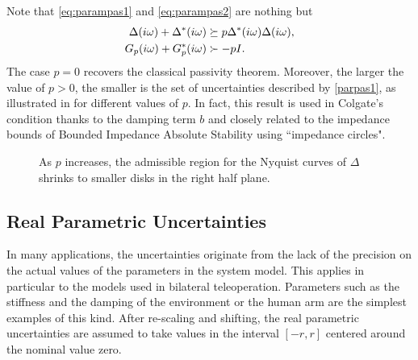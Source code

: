 \begin{rem}Note that \eqref{eq:parampas1} and \eqref{eq:parampas2} are nothing but
\begin{align}
	\Delta(i\omega) + \Delta^*(i\omega) &\succeq p\Delta^*(i\omega)\Delta(i\omega),\label{parpas1}\\
	G_p(i\omega) + G_p^*(i\omega) &\succ -pI.\label{parpas2}
\end{align}
The case $p=0$ recovers the classical passivity theorem. Moreover, the larger the value of $p>0$, the smaller is the set of uncertainties described by \eqref{parpas1}, as illustrated in  for different values of $p$. In fact, this result is used in Colgate's condition thanks to the damping term $b$ and closely related to the impedance bounds of Bounded Impedance Absolute Stability \cite{haddadizaad} using ``impedance circles".
\end{rem}

\begin{figure}%
\centering
{}
\caption{As $p$ increases, the admissible region for the Nyquist curves of $\Delta$ shrinks to smaller disks in the right half plane.}
\label{fig:pregions}%
\end{figure}


\subsection{Real Parametric Uncertainties}\label{sec:ltvenv}
In many applications, the uncertainties originate from the lack of the precision
on the actual values of the parameters in the system model. This applies in
particular to the models used in bilateral teleoperation. Parameters such as the
stiffness and the damping of the environment or the human arm are the simplest
examples of this kind. After re-scaling and shifting, the real parametric uncertainties
are assumed to take values in the interval $\left[ -r,r \right]$ centered around
the nominal value zero.

